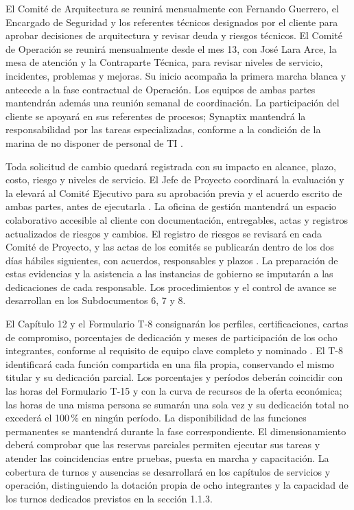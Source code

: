El Comité de Arquitectura se reunirá mensualmente con Fernando Guerrero, el Encargado de Seguridad y los referentes técnicos designados por el cliente para aprobar decisiones de arquitectura y revisar deuda y riesgos técnicos. El Comité de Operación se reunirá mensualmente desde el mes 13, con José Lara Arce, la mesa de atención y la Contraparte Técnica, para revisar niveles de servicio, incidentes, problemas y mejoras. Su inicio acompaña la primera marcha blanca y antecede a la fase contractual de Operación. Los equipos de ambas partes mantendrán además una reunión semanal de coordinación. La participación del cliente se apoyará en sus referentes de procesos; Synaptix mantendrá la responsabilidad por las tareas especializadas, conforme a la condición de la marina de no disponer de personal de TI \parencite[cap.~10, restricción~7]{caso07}.

Toda solicitud de cambio quedará registrada con su impacto en alcance, plazo, costo, riesgo y niveles de servicio. El Jefe de Proyecto coordinará la evaluación y la elevará al Comité Ejecutivo para su aprobación previa y el acuerdo escrito de ambas partes, antes de ejecutarla \parencite[art.~72, p.~38]{bases-admin}. La oficina de gestión mantendrá un espacio colaborativo accesible al cliente con documentación, entregables, actas y registros actualizados de riesgos y cambios. El registro de riesgos se revisará en cada Comité de Proyecto, y las actas de los comités se publicarán dentro de los dos días hábiles siguientes, con acuerdos, responsables y plazos \parencite[RT-19.03 a RT-19.05, p.~33; RT-19.09, p.~34]{bases-transversales}. La preparación de estas evidencias y la asistencia a las instancias de gobierno se imputarán a las dedicaciones de cada responsable. Los procedimientos y el control de avance se desarrollan en los Subdocumentos 6, 7 y 8.

El Capítulo 12 y el Formulario T-8 consignarán los perfiles, certificaciones, cartas de compromiso, porcentajes de dedicación y meses de participación de los ocho integrantes, conforme al requisito de equipo clave completo y nominado \parencite[art.~34.1, p.~22]{bases-admin}. El T-8 identificará cada función compartida en una fila propia, conservando el mismo titular y su dedicación parcial. Los porcentajes y períodos deberán coincidir con las horas del Formulario T-15 y con la curva de recursos de la oferta económica; las horas de una misma persona se sumarán una sola vez y su dedicación total no excederá el 100\,\% en ningún período. La disponibilidad de las funciones permanentes se mantendrá durante la fase correspondiente. El dimensionamiento deberá comprobar que las reservas parciales permiten ejecutar sus tareas y atender las coincidencias entre pruebas, puesta en marcha y capacitación. La cobertura de turnos y ausencias se desarrollará en los capítulos de servicios y operación, distinguiendo la dotación propia de ocho integrantes y la capacidad de los turnos dedicados previstos en la sección 1.1.3.


